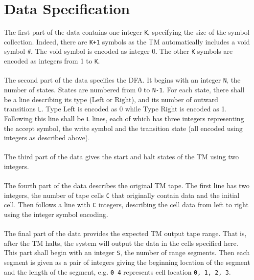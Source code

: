 \documentclass[11pt]{article}
\begin{document}
\section{Data Specification}
\label{sec:data}
The first part of the data contains one integer {\tt K}, specifying the size of the symbol collection. Indeed, there are {\tt K+1} symbols as the TM automatically includes a void symbol {\tt \#}. The void symbol is encoded as integer 0. The other {\tt K} symbols are encoded as integers from 1 to {\tt K}.\\\\
The second part of the data specifies the DFA. It begins with an integer {\tt N}, the number of states. States are numbered from 0 to {\tt N-1}. For each state, there shall be a line describing its type (Left or Right), and its number of outward transitions {\tt L}. Type Left is encoded as 0 while Type Right is encoded as 1. Following this line shall be {\tt L} lines, each of which has three integers representing the accept symbol, the write symbol and the transition state (all encoded using integers as described above).\\\\
The third part of the data gives the start and halt states of the TM using two integers.\\\\
The fourth part of the data describes the original TM tape. The first line has two integers, the number of tape cells {\tt C} that originally contain data and the initial cell. Then follows a line with {\tt C} integers, describing the cell data from left to right using the integer symbol encoding.\\\\
The final part of the data provides the expected TM output tape range. That is, after the TM halts, the system will output the data in the cells specified here. This part shall begin with an integer {\tt S}, the number of range segments. Then each segment is given as a pair of integers giving the beginning location of the segment and the length of the segment, e.g. {\tt 0 4} represents cell location {\tt 0, 1, 2, 3}. \\
\end{document}
